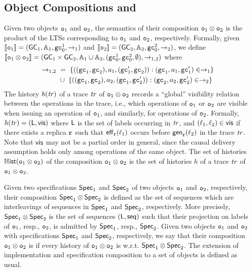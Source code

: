 \subsection{Object Compositions and \CRDTLin{}}\label{ssec:comp_intro}

Given two objects $\mathtt{o}_1$ and $\mathtt{o}_2$, the semantics of their composition $\mathtt{o}_1\otimes \mathtt{o}_2$ is the product of the LTSs corresponding to $\mathtt{o}_1$ and $\mathtt{o}_2$, respectively. Formally, given $\llbracket \mathtt{o}_1 \rrbracket =(\mathsf{GC}_1,\mathbb{A}_1,\mathtt{gc}_0^1,\rightarrow_1)$ and $\llbracket \mathtt{o}_2 \rrbracket =(\mathsf{GC}_2,\mathbb{A}_2,\mathtt{gc}_0^2,\rightarrow_2)$, we define $\llbracket \mathtt{o}_1\otimes \mathtt{o}_2 \rrbracket =(\mathsf{GC}_1\times \mathsf{GC}_2,\mathbb{A}_1\cup \mathbb{A}_2,(\mathtt{gc}_0^1,\mathtt{gc}_0^2,\emptyset),\rightarrow_{1,2})$ where
\begin{align*}
\rightarrow_{1,2}\ & =\ \{ ((\mathtt{gc}_1,\mathtt{gc}_2),a_1,(\mathtt{gc}_1',\mathtt{gc}_2)): (\mathtt{gc}_1,a_1,\mathtt{gc}_1')\in\rightarrow_1\} \\
& \cup\ \{ ((\mathtt{gc}_1,\mathtt{gc}_2),a_2,(\mathtt{gc}_1,\mathtt{gc}_2')): (\mathtt{gc}_2,a_2,\mathtt{gc}_2')\in\rightarrow_2\}
\end{align*}
The history $\mathit{h}({\mathit{tr})}$ of a trace $\mathit{tr}$ of $\mathtt{o}_1\otimes \mathtt{o}_2$ records a ``global'' visibility relation between the operations in the trace, i.e., which operations of $\mathtt{o}_1$ or $\mathtt{o}_2$ are visible when issuing an operation of $\mathtt{o}_1$, and similarly, for operations of $\mathtt{o}_2$. Formally, $\mathit{h}({\mathit{tr})}=(\mathsf{L}, \mathsf{vis})$ where $\mathsf{L}$ is the set of labels occurring in $\mathit{tr}$, and $(\ell_1,\ell_2)\in\mathsf{vis}$ if there exists a replica $\mathtt{r}$ such that $\mathsf{eff}_{\mathtt{r}}(\ell_1)$ occurs before $\mathsf{gen}_{\mathtt{r}}(\ell_2)$ in the trace $\mathit{tr}$. Note that $\mathsf{vis}$ may not be a partial order in general, since the causal delivery assumption holds only among operations of the same object. The set of histories $\mathbb{H}\mathsf{ist}(\mathtt{o}_1\otimes \mathtt{o}_2)$ of the composition $\mathtt{o}_1\otimes \mathtt{o}_2$ is the set of histories $h$ of a trace $\mathit{tr}$ of $\mathtt{o}_1\otimes \mathtt{o}_2$.

Given two specifications $\mathsf{Spec}_1$ and $\mathsf{Spec}_2$ of two objects $\mathtt{o}_1$ and $\mathtt{o}_2$, respectively, their composition $\mathsf{Spec}_1\otimes \mathsf{Spec}_2$ is defined as the set of sequences which are interleavings of sequences in $\mathsf{Spec}_1$ and $\mathsf{Spec}_2$, respectively. More precisely, $\mathsf{Spec}_1\otimes \mathsf{Spec}_2$ is the set of sequences $(\mathsf{L},\mathsf{seq})$ such that their projection on labels of $\mathtt{o}_1$, resp., $\mathtt{o}_2$, is admitted by $\mathsf{Spec}_1$, resp., $\mathsf{Spec}_2$. Given two objects  $\mathtt{o}_1$ and $\mathtt{o}_2$ with specifications $\mathsf{Spec}_1$ and $\mathsf{Spec}_2$, respectively, we say that their composition $\mathtt{o}_1\otimes \mathtt{o}_2$ is \emph{\crdtlinearizable{}} if every history of $\mathtt{o}_1\otimes \mathtt{o}_2$ is \crdtlinearizable{} w.r.t. $\mathsf{Spec}_1\otimes \mathsf{Spec}_2$. The extension of implementation and specification composition to a set of objects is defined as usual.

